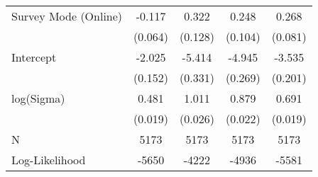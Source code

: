 \begin{table}[ht]
\begin{tabular}{lcccc}
  Survey Mode (Online) & -0.117 &  0.322 &  0.248 &  0.268 \\ 
   & (0.064) & (0.128) & (0.104) & (0.081) \\ 
  Intercept & -2.025 & -5.414 & -4.945 & -3.535 \\ 
   & (0.152) & (0.331) & (0.269) & (0.201) \\ 
  log(Sigma) &  0.481 &  1.011 &  0.879 &  0.691 \\ 
   & (0.019) & (0.026) & (0.022) & (0.019) \\ 
   \hline
N & 5173 & 5173 & 5173 & 5173 \\ 
  Log-Likelihood & -5650 & -4222 & -4936 & -5581 \\ 
   \hline
\end{tabular}
\endgroup
\end{table}
